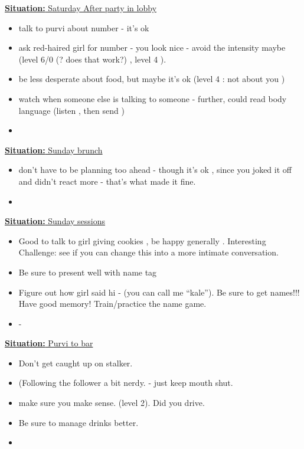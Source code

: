 \documentclass[11pt]{article}
\newcommand{\newSituation}[1]{\underline{\textbf{Situation:} #1} }
\begin{document}
\newSituation{Saturday After party in lobby} 
\begin{itemize} 
\item talk to purvi about number - it's ok 
\item ask red-haired girl for number - you look nice - avoid the intensity maybe (level 6/0  (? does  that work?) , level 4  ).  
\item be less desperate about food, but maybe it's ok  (level 4 : not about you )  
\item watch when someone else is talking to someone  -  further, could read body language (listen , then send ) 
\item 
\end{itemize}


\newSituation{  Sunday brunch} 
\begin{itemize} 
\item don't have to be planning too ahead - though it's ok , since you joked it off and didn't react more - that's what made it fine. 
\item 
\end{itemize} 

\newSituation{Sunday sessions} 
\begin{itemize} 
\item Good to talk to girl giving  cookies , be happy generally . Interesting Challenge: see if you can change this into a more intimate conversation. 
\item Be sure to present well with name tag
\item Figure out how girl said hi - (you can call me ``kale'').  Be sure to get names!!!  Have good memory!  Train/practice the name game. 
\item - 
\end{itemize} 



\newSituation{Purvi to bar} 
\begin{itemize} 
\item Don't get caught up on stalker. 
\item (Following the follower a bit nerdy. - just keep mouth shut. 
\item make sure you make sense. (level 2). Did you drive. 
\item Be sure to manage drinks better. 
\item 
\end{itemize} 
\end{document}
